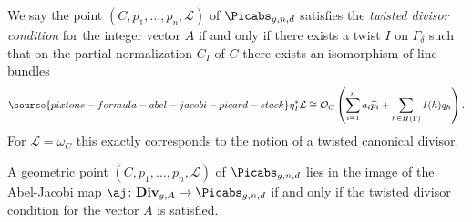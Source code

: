 We say the point $(C,p_1, \ldots, p_n, \mathcal{L})$ of $\Picabs_{g,n,d}$ satisfies the \emph{twisted divisor condition} for the integer vector $A$ if and only if there exists a twist $I$ on $\Gamma_\delta$ such that on the partial normalization $C_I$ of $C$ there exists an isomorphism of line bundles
\begin{equation}\label{eq:twisted_diff_condition}
\source{pixtons-formula-abel-jacobi-picard-stack}
    \eta_I^* \mathcal{L} \cong  \mathcal{O}_C\left(\sum_{i=1}^n a_i \widehat{p}_i + \sum_{h \in H(\Gamma)} I(h) q_h \right).
\end{equation}
For $\mathcal{L}=\omega_C$ this exactly corresponds to the notion \cite[Definition 1]{Farkas2016The-moduli-spac} of a twisted canonical divisor.

\begin{proposition}
\notready\label{prop:aj_image}
A geometric point $(C,p_1, \ldots, p_n, \mathcal{L})$ of $\Picabs_{g,n,d}$ lies in the image of the Abel-Jacobi map $\aj \colon \cat{Div}_{g,A} \to \Picabs_{g,n,d}$ if and only if the twisted divisor condition for the vector $A$ is satisfied.
\end{proposition}















